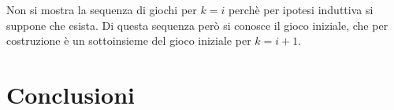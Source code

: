 \documentclass[a4paper,openright,twoside,12pt]{report}
\begin{document}
Non si mostra la sequenza di giochi per $k=i$ perch\`e per ipotesi induttiva si suppone che esista.
Di questa sequenza per\`o si conosce il gioco iniziale, che per costruzione \`e un sottoinsieme del gioco iniziale per $k=i+1$.



\chapter{Conclusioni}
\lhead[\fancyplain{}{\bfseries\thepage}]{\fancyplain{}{\bfseries\rightmark}}
	
		
\end{document}
